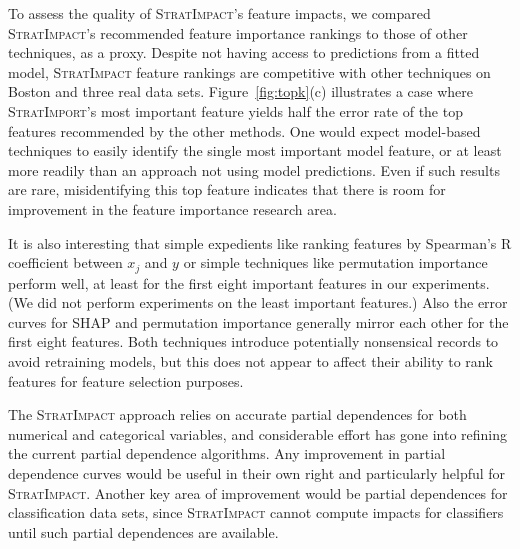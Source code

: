 \documentclass[11pt]{article}
\newcommand{\figref}[1]{Figure~\ref{#1}}
\newcommand{\todo}[1]{{{\small\color{red}{[#1]}}}}
\newcommand{\simp}{\fontfamily{cmr}\textsc{\small StratImpact}}
\newcommand{\simpo}{\fontfamily{cmr}\textsc{\small StratImport}}
\begin{document}
To assess the quality of \simp's feature impacts, we compared \simp's recommended feature importance rankings to those of other techniques, as a proxy. Despite not having access to predictions from a fitted model, \simp{} feature rankings are competitive with other techniques on Boston and three real data sets.  \figref{fig:topk}(c) illustrates a case where \simpo's most important feature yields half the error rate of the top features recommended by the other methods.  One would expect model-based techniques to easily identify the single most important model feature, or at least more readily than an approach not using model predictions.  Even if such results are rare, misidentifying this top feature indicates that there is room for improvement in the feature importance research area. 

It is also interesting that simple expedients like ranking features by Spearman's R coefficient between $x_j$ and $y$ or simple techniques like permutation importance perform well, at least for the first eight important features in our experiments. (We did not perform experiments on the least important features.) Also the error curves for SHAP and permutation importance generally mirror each other for the first eight features.  Both techniques introduce potentially nonsensical records to avoid retraining models, but this does not appear to affect their ability to rank features for feature selection purposes.

\todo{ interrogating OLS to get rankings then using a more powerful model is worth exploring.}

The \simp{} approach relies on accurate partial dependences for both numerical and categorical variables, and considerable effort has gone into refining the current partial dependence algorithms.  Any improvement in partial dependence curves would be useful in their own right and particularly helpful for \simp.   Another key area of improvement would be partial dependences for classification data sets, since \simp{} cannot compute impacts for classifiers until such partial dependences are available.
\end{document}
